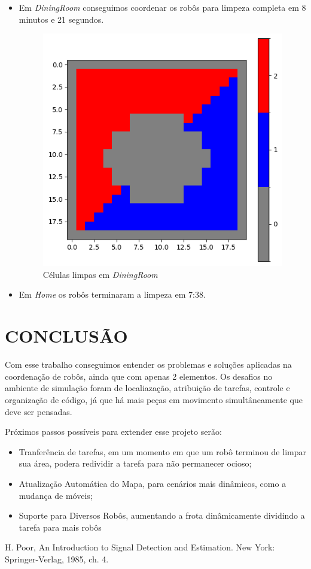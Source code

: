 \documentclass[a4paper, 10pt, conference]{ieeeconf}      %
\begin{document}
\begin{itemize}
    \item Em \textit{DiningRoom} conseguimos coordenar os robôs para limpeza completa em 8 minutos e
          21 segundos.
          \begin{figure}[htb!]
              \centering
              \includegraphics[scale=0.4]{../clean.png}
              \caption{Células limpas em \textit{DiningRoom}}
          \end{figure}
    \item Em \textit{Home} os robôs terminaram a limpeza em 7:38.
\end{itemize}


\newpage

\section{CONCLUSÃO}

Com esse trabalho conseguimos entender os problemas e soluções aplicadas na coordenação
de robôs, ainda que com apenas 2 elementos. Os desafios no ambiente de simulação foram de
localiazação, atribuição de tarefas, controle e organização de código, já que há mais peças
em movimento simultâneamente que deve ser pensadas.

Próximos passos possíveis para extender esse projeto serão:
\begin{itemize}
    \item Tranferência de tarefas, em um momento em que um robô terminou de limpar sua área, podera redividir a tarefa para não permanecer ocioso;
    \item Atualização Automática do Mapa, para cenários mais dinâmicos, como a mudança de móveis;
    \item Suporte para Diversos Robôs, aumentando a frota dinâmicamente dividindo a tarefa para mais robôs
\end{itemize}

\begin{thebibliography}{99}
    
     H. Poor, An Introduction to Signal Detection and Estimation.   New York: Springer-Verlag, 1985, ch. 4.
    
    
\end{thebibliography}
\end{document}
